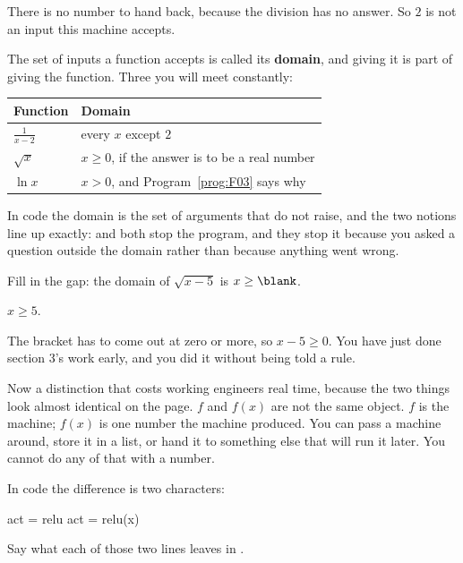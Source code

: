 \begin{fr}
There is no number to hand back, because the division has no answer. So $2$ is
not an input this machine accepts.

The set of inputs a function accepts is called its \textbf{domain}, and giving
it is part of giving the function. Three you will meet constantly:

\begin{center}
\begin{tabular}{ll}
\toprule
Function & Domain \\
\midrule
$\frac{1}{x - 2}$ & every $x$ except $2$ \\
$\sqrt{x}$ & $x \ge 0$, if the answer is to be a real number \\
$\ln x$ & $x > 0$, and Program~\ref{prog:F03} says why \\
\bottomrule
\end{tabular}
\end{center}

In code the domain is the set of arguments that do not raise, and the two
notions line up exactly:  and  both stop
the program, and they stop it because you asked a question outside the domain
rather than because anything went wrong.

Fill in the gap: the domain of $\sqrt{x - 5}$ is $x \ge \blank$.
\dotline
\nextframe
\end{fr}

\begin{fr}
\begin{ansblock}
$x \ge 5$.
\end{ansblock}

The bracket has to come out at zero or more, so $x - 5 \ge 0$. You have just
done section 3's work early, and you did it without being told a rule.

Now a distinction that costs working engineers real time, because the two
things look almost identical on the page. $f$ and $f(x)$ are not the same
object. $f$ is the machine; $f(x)$ is one number the machine produced. You can
pass a machine around, store it in a list, or hand it to something else that
will run it later. You cannot do any of that with a number.

In code the difference is two characters:

\begin{python}
act = relu
act = relu(x)
\end{python}

Say what each of those two lines leaves in .
\nextframe
\end{fr}

